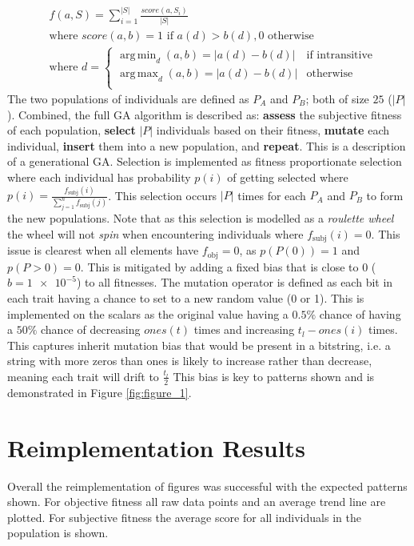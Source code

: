 \documentclass[11pt,a4paper]{article}
\DeclareMathOperator*{\argmin}{arg\,min}
\DeclareMathOperator*{\argmax}{arg\,max}
\begin{document}
\begin{equation}
\label{eq:scoring}
\begin{split}
&f(a, S)=\sum^{|S|}_{i=1}\frac{score(a, S_i)}{|S|} \\
&\text{where } score(a,b) = 1 \text{ if } a(d) > b(d), 0 \text{ otherwise} \\
&\text{where } d =
\begin{cases}
    \argmin_d (a, b) = |a(d) - b(d)|& \text{if intransitive}\\
    \argmax_d (a, b) = |a(d) - b(d)|& \text{otherwise}\\
\end{cases}
\end{split}
\end{equation}
The two populations of individuals are defined as $P_A$ and $P_B$; both of size $25$ ($|P|$). Combined, the full GA algorithm is described as: \textbf{assess} the subjective fitness of each population, \textbf{select} $|P|$ individuals based on their fitness, \textbf{mutate} each individual, \textbf{insert} them into a new population, and \textbf{repeat}. This is a description of a generational GA. Selection is implemented as fitness proportionate selection where each individual has probability $p(i)$ of getting selected where $p(i)=\frac{f_\text{subj}(i)}{\sum^n_{j=1}f_\text{subj}(j)}$. This selection occurs  $|P|$ times for each $P_A$ and $P_B$ to form the new populations. Note that as this selection is modelled as a \textit{roulette wheel} the wheel will not \textit{spin} when encountering individuals where $f_\text{subj}(i)=0$. This issue is clearest when all elements have $f_\text{obj}=0$, as $p(P(0))=1$ and $p(P{>0})=0$. This is mitigated by adding a fixed bias that is close to 0 ($b = \num{1e-5}$) to all fitnesses. The mutation operator is defined as each bit in each trait having a chance to set to a new random value (0 or 1). This is implemented on the scalars as the original value having a $0.5\%$ chance of having a $50\%$ chance of decreasing $ones(t)$ times and increasing $t_l - ones(i)$ times. This captures inherit mutation bias that would be present in a bitstring, i.e. a string with more zeros than ones is likely to increase rather than decrease, meaning each trait will drift to $\frac{t_l}{2}$ This bias is key to patterns shown and is demonstrated in Figure \ref{fig:figure_1}. 


\section{Reimplementation Results}
Overall the reimplementation of figures was successful with the expected patterns shown. For objective fitness all raw data points and an average trend line are plotted. For subjective fitness the average score for all individuals in the population is shown.
\end{document}
